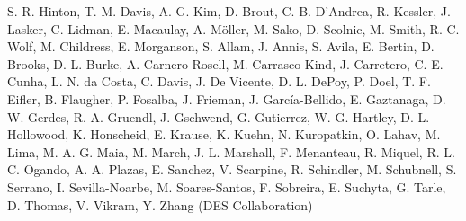 S. R. Hinton, T. M. Davis, A. G. Kim, D. Brout, C. B. D'Andrea, R. Kessler, J. Lasker, C. Lidman, E. Macaulay, A. M\"oller, M. Sako, D. Scolnic, M. Smith, R. C. Wolf, M. Childress, E. Morganson, S. Allam, J. Annis, S. Avila, E. Bertin, D. Brooks, D. L. Burke, A. Carnero Rosell, M. Carrasco Kind, J. Carretero, C. E. Cunha, L. N. da Costa, C. Davis, J. De Vicente, D. L. DePoy, P. Doel, T. F. Eifler, B. Flaugher, P. Fosalba, J. Frieman, J. Garc\'ia-Bellido, E. Gaztanaga, D. W. Gerdes, R. A. Gruendl, J. Gschwend, G. Gutierrez, W. G. Hartley, D. L. Hollowood, K. Honscheid, E. Krause, K. Kuehn, N. Kuropatkin, O. Lahav, M. Lima, M. A. G. Maia, M. March, J. L. Marshall, F. Menanteau, R. Miquel, R. L. C. Ogando, A. A. Plazas, E. Sanchez, V. Scarpine, R. Schindler, M. Schubnell, S. Serrano, I. Sevilla-Noarbe, M. Soares-Santos, F. Sobreira, E. Suchyta, G. Tarle, D. Thomas, V. Vikram, Y. Zhang (DES Collaboration)